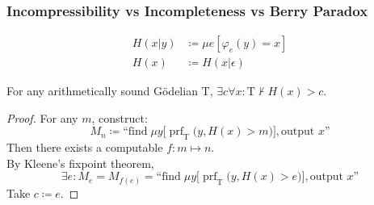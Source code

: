 \documentclass[UTF8,aspectratio=43,11pt,colorlinks,compress,openany]{beamer}%
\begin{document}
\begin{frame}\frametitle{Incompressibility vs Incompleteness vs Berry Paradox}
\setlength\abovedisplayskip{0pt}
\setlength\belowdisplayskip{0pt}
	\begin{definition}
		\begin{align*}
		H(x|y)&\coloneqq \mu e[\varphi_e(y)=x]\\
		H(x)&\coloneqq H(x|\epsilon)
		\end{align*}
	\end{definition}
	\begin{theorem}[Chaitin]
		For any arithmetically sound G\"odelian $\mathrm{T}$, $\exists c\forall x: \mathrm{T}\nvdash H(x)>c$.
	\end{theorem}
	\begin{proof}
		For any $m$, construct:
		\[M_n\coloneqq \text{``find}\;\mu y\big[\operatorname{prf}_{\mathrm{T}}\big(y,H(x)>m\big)\big], \text{output $x$''}\]
		Then there exists a computable $f: m\mapsto n$.\\
		By Kleene's fixpoint theorem,
		\[\exists e: M_e=M_{f(e)}=\text{``find}\;\mu y\big[\operatorname{prf}_{\mathrm{T}}\big(y,H(x)>e\big)\big], \text{output $x$''}\]
		Take $c\coloneqq e$.
	\end{proof}
\end{frame}
\end{document}
